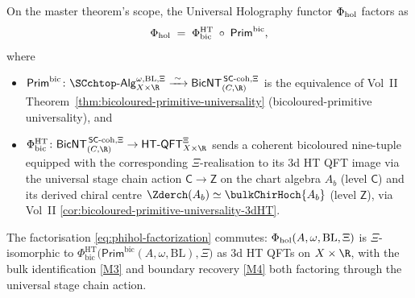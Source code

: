 \begin{corollary}
\label{cor:universal-holography-via-bicoloured-universality}%
%
%
On the master theorem's scope, the Universal Holography functor
$\Phi_{\mathrm{hol}}$ factors as
\begin{equation}\label{eq:phihol-factorization}
\Phi_{\mathrm{hol}} \;=\; \Phi^{\mathrm{HT}}_{\mathrm{bic}}
 \;\circ\; \mathsf{Prim}^{\mathrm{bic}},
\end{equation}
where
\begin{itemize}
\item $\mathsf{Prim}^{\mathrm{bic}}\colon
 \SCchtop\text{-}\mathsf{Alg}^{\omega, \mathrm{BL},\Xi}_{X \times \R}
 \xrightarrow{\;\sim\;}
 \mathsf{BicNT}^{\,\mathsf{SC}\text{-coh},\Xi}_{(C, \R)}$
is the equivalence of
\textup{Vol~II Theorem~\ref{thm:bicoloured-primitive-universality}}
(bicoloured-primitive universality), and
\item $\Phi^{\mathrm{HT}}_{\mathrm{bic}}\colon
 \mathsf{BicNT}^{\,\mathsf{SC}\text{-coh},\Xi}_{(C, \R)}
 \to \HTQFTclimax^{\Xi}_{X \times \R}$
sends a coherent bicoloured nine-tuple equipped with the corresponding
\(\Xi\)-realisation to its $3$d HT QFT image via the universal stage
chain action $\mathsf{C} \to \mathsf{Z}$
on the chart algebra $A_b$ \textup(level $\mathsf{C}$\textup) and
its derived chiral centre $\Zderch(A_b) \simeq \bulkChirHoch{A_b}$
\textup(level $\mathsf{Z}$\textup), via Vol~II
\cref{cor:bicoloured-primitive-universality-3dHT}.
\end{itemize}
The factorisation \eqref{eq:phihol-factorization} commutes:
$\Phi_{\mathrm{hol}}(A,\omega,\mathrm{BL},\Xi)$ is \(\Xi\)-isomorphic to
$\Phi^{\mathrm{HT}}_{\mathrm{bic}}\bigl(\mathsf{Prim}^{\mathrm{bic}}(A,
\omega, \mathrm{BL}),\Xi\bigr)$ as $3$d HT QFTs on $X \times \R$, with
the bulk identification \eqref{M3} and boundary recovery
\eqref{M4} both factoring through the universal stage chain
action.
\end{corollary}

